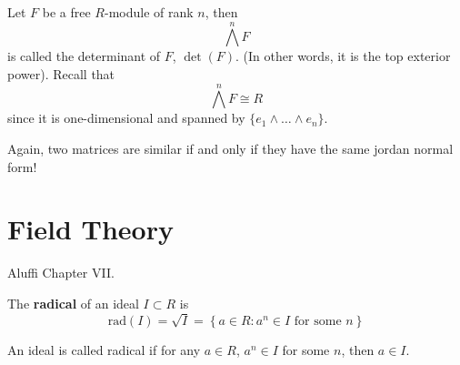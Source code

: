 \documentclass[openany]{book}
\newcommand{\rad}{\text{rad}}
\begin{document}
\begin{defn}[determinant]
    Let $F$ be a free $R$-module of rank $n$, then 
    \begin{equation*}
        \bigwedge^nF
    \end{equation*}
    is called the determinant of $F$, $\det(F)$. (In other words, it is the top exterior power). Recall that 
    \begin{equation*}
        \bigwedge^nF\cong R
    \end{equation*}
    since it is one-dimensional and spanned by $\{e_1\wedge\dots\wedge e_n\}$.
\end{defn}

\begin{warn}
    Again, two matrices are similar if and only if they have the same jordan normal form!
\end{warn}

























































\chapter{Field Theory}

Aluffi Chapter VII. 


\begin{defn}[radical]
    The \textbf{radical} of an ideal $I\subset R$ is 
    \begin{equation*}
        \rad(I)=\sqrt{I}=\left\{a\in R: a^n\in I \text{ for some $n$}\right\}
    \end{equation*}

    An ideal is called radical if for any $a\in R$, $a^n\in I$ for some $n$, then $a\in I$.
\end{defn}
\end{document}
